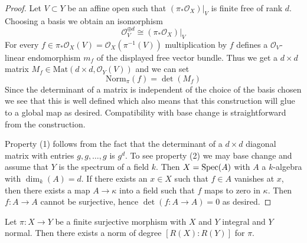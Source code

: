 \begin{proof}
Let $V \subset Y$ be an affine open such that $(\pi_*\mathcal{O}_X)|_V$
is finite free of rank $d$. Choosing a basis we obtain an isomorphism
$$
\mathcal{O}_V^{\oplus d} \cong (\pi_*\mathcal{O}_X)|_V
$$
For every $f \in \pi_*\mathcal{O}_X(V) = \mathcal{O}_X(\pi^{-1}(V))$
multiplication by $f$ defines a $\mathcal{O}_V$-linear endomorphism
$m_f$ of the displayed free vector bundle. Thus we get a $d \times d$
matrix $M_f \in \text{Mat}(d \times d, \mathcal{O}_Y(V))$ and we can set
$$
\text{Norm}_\pi(f) = \det(M_f)
$$
Since the determinant of a matrix is independent of the choice of
the basis chosen we see that this is well defined which also means
that this construction will glue to a global map as desired.
Compatibility with base change is straightforward from the construction.

\medskip\noindent
Property (1) follows from the fact that the determinant of a
$d \times d$ diagonal matrix with entries $g, g, \ldots, g$ is $g^d$.
To see property (2) we may base change and assume that $Y$ is the
spectrum of a field $k$. Then $X = \mathop{\mathrm{Spec}}(A)$ with $A$ a $k$-algebra
with $\dim_k(A) = d$. If there exists an $x \in X$ such that
$f \in A$ vanishes at $x$, then there exists a map $A \to \kappa$
into a field such that $f$ maps to zero in $\kappa$. Then
$f : A \to A$ cannot be surjective, hence $\det(f : A \to A) = 0$
as desired.
\end{proof}

\begin{lemma}
\label{lemma-norm-in-normal-case}
Let $\pi : X \to Y$ be a finite surjective morphism with $X$ and $Y$
integral and $Y$ normal. Then there exists a norm of degree
$[R(X) : R(Y)]$ for $\pi$.
\end{lemma}

